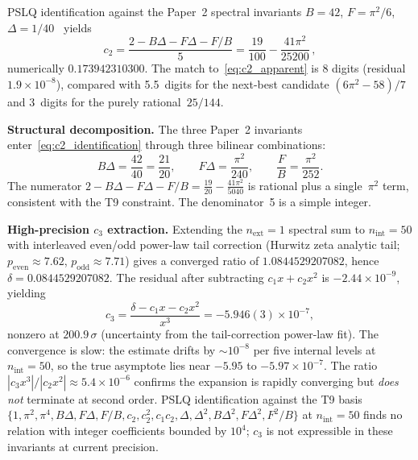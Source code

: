 \documentclass[11pt]{article}
\begin{document}
PSLQ identification against the Paper~2 spectral invariants $B = 42$,
$F = \pi^2/6$, $\Delta = 1/40$~\cite{paper2} yields
\begin{equation}
  \boxed{c_2
    = \frac{2 - B\Delta - F\Delta - F/B}{5}
    = \frac{19}{100} - \frac{41\pi^2}{25200}\,,}
  \label{eq:c2_identification}
\end{equation}
numerically $0.173942310300$.  The match to~\eqref{eq:c2_apparent}
is 8 digits (residual $1.9 \times 10^{-8}$), compared with 5.5~digits
for the next-best candidate $(6\pi^2 - 58)/7$ and 3~digits for the
purely rational~$25/144$.

\medskip
\noindent\textbf{Structural decomposition.}
The three Paper~2 invariants enter~\eqref{eq:c2_identification}
through three bilinear combinations:
\begin{equation}
  B\Delta = \frac{42}{40} = \frac{21}{20}, \qquad
  F\Delta = \frac{\pi^2}{240}, \qquad
  \frac{F}{B} = \frac{\pi^2}{252}.
\end{equation}
The numerator $2 - B\Delta - F\Delta - F/B
  = \frac{19}{20} - \frac{41\pi^2}{5040}$
is rational plus a single~$\pi^2$ term, consistent with the T9
constraint.  The denominator~5 is a simple integer.

\medskip
\noindent\textbf{High-precision $c_3$ extraction.}
Extending the $n_{\mathrm{ext}}=1$ spectral sum to $n_{\mathrm{int}}=50$
with interleaved even/odd power-law tail correction
(Hurwitz zeta analytic tail; $p_{\mathrm{even}} \approx 7.62$,
$p_{\mathrm{odd}} \approx 7.71$) gives a converged ratio of
$1.0844529207082$, hence $\delta = 0.0844529207082$.
The residual after subtracting $c_1 x + c_2 x^2$ is
$-2.44 \times 10^{-9}$, yielding
\begin{equation}
  c_3 = \frac{\delta - c_1 x - c_2 x^2}{x^3}
       = -5.946(3) \times 10^{-7},
  \label{eq:c3_numerical}
\end{equation}
nonzero at $200.9\,\sigma$ (uncertainty from the tail-correction power-law
fit).  The convergence is slow: the estimate drifts by $\sim 10^{-8}$
per five internal levels at $n_{\mathrm{int}}=50$, so the true asymptote
lies near $-5.95$ to $-5.97 \times 10^{-7}$.  The ratio
$|c_3 x^3| / |c_2 x^2| \approx 5.4 \times 10^{-6}$ confirms the
expansion is rapidly converging but \emph{does not} terminate at
second order.  PSLQ identification against the T9 basis
$\{1, \pi^2, \pi^4, B\Delta, F\Delta, F/B, c_2, c_2^2, c_1 c_2,
\Delta, \Delta^2, B\Delta^2, F\Delta^2, F^2/B\}$
at $n_{\mathrm{int}}=50$ finds no relation with integer coefficients
bounded by $10^4$; $c_3$ is not expressible in these invariants at
current precision.
\end{document}
